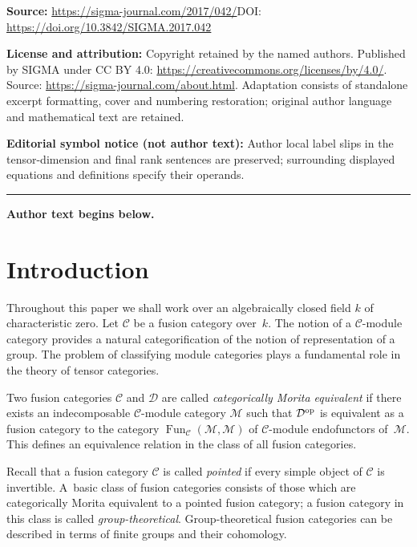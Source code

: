 \documentclass[11pt]{article}
\numberwithin{equation}{section}
\newcommand{\C}{{\mathcal C}}
\newcommand{\D}{{\mathcal D}}
\newcommand{\M}{{\mathcal M}}
\newcommand{\1}{\textbf{1}}
\begin{document}
\noindent\textbf{Source:} \url{https://sigma-journal.com/2017/042/}\quad DOI: \url{https://doi.org/10.3842/SIGMA.2017.042}\par
\noindent\textbf{License and attribution:} Copyright retained by the named authors. Published by SIGMA under CC BY 4.0: \url{https://creativecommons.org/licenses/by/4.0/}. Source: \url{https://sigma-journal.com/about.html}. Adaptation consists of standalone excerpt formatting, cover and numbering restoration; original author language and mathematical text are retained.\par
\noindent\textbf{Editorial symbol notice (not author text):} Author local label slips in the tensor-dimension and final rank sentences are preserved; surrounding displayed equations and definitions specify their operands.\par
\medskip\hrule\medskip\noindent\textbf{Author text begins below.}\par
\setcounter{section}{0}
\setcounter{subsection}{0}
\setcounter{subsubsection}{0}
\setcounter{Theorem}{0}
\setcounter{equation}{0}
\section{Introduction}

Throughout this paper we shall work over an algebraically closed f\/ield $k$ of characteristic zero. Let $\mathcal{C}$ be a fusion category over~$k$. The notion of a $\C$-module category provides a natural categorif\/ication of the notion of representation of a group. The problem of classifying module categories plays a fundamental role in the theory of tensor categories.

Two fusion categories $\C$ and $\D$ are called \emph{categorically Morita equivalent} if there exists an indecomposable $\mathcal{C}$-module category $\mathcal{M}$ such that $\mathcal{D}^{\rm op}$ is equivalent as a fusion category to the category $\operatorname{Fun}_\C(\M, \M)$ of $\C$-module endofunctors of~$\M$. This def\/ines an equivalence relation in the class of all fusion categories.

Recall that a fusion category $\C$ is called \emph{pointed} if every simple object of $\C$ is invertible. A~basic class of fusion categories consists of those which are categorically Morita equivalent to a pointed fusion category; a fusion category in this class is called \emph{group-theoretical}. Group-theoretical fusion categories can be described in terms of f\/inite groups and their cohomology.
\end{document}
